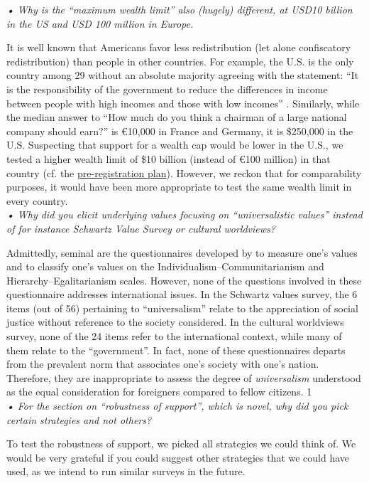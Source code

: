 \documentclass[12pt,english]{article}
\begin{document}
\textit{• Why is the “maximum wealth limit” also (hugely) different, at USD10 billion in the US and USD 100 million in Europe.} 

It is well known that Americans favor less redistribution (let alone confiscatory redistribution) than people in other countries. For example, the U.S. is the only country among 29 without an absolute majority agreeing with the statement: ``It is the responsibility of the government to reduce the differences in income between people with high incomes and those with low incomes'' \citep{issp_international_2019}. Similarly, while the median answer to ``How much do you think a chairman of a large national company should earn?'' is \euro{}10,000 in France and Germany, it is \$250,000 in the U.S. Suspecting that support for a wealth cap would be lower in the U.S., we tested a higher wealth limit of \$10 billion (instead of \euro{}100 million) in that country (cf. the \href{https://osf.io/2b6vq}{pre-registration plan}). However, we reckon that for comparability purposes, it would have been more appropriate to test the same wealth limit in every country.
~\\

\textit{• Why did you elicit underlying values focusing on “universalistic values” instead of for instance Schwartz Value Survey or cultural worldviews?}%

Admittedly, seminal are the questionnaires developed by \citet{schwartz_are_1994} to measure one's values and \citet{douglas_risk_1982} to classify one's values on the Individualism--Communitarianism and Hierarchy--Egalitarianism scales. However, none of the questions involved in these questionnaire addresses international issues. In the Schwartz values survey, the 6 items (out of 56) pertaining to ``universalism'' relate to the appreciation of social justice without reference to the society considered. In the cultural worldviews survey, none of the 24 items refer to the international context, while many of them relate to the ``government''. In fact, none of these questionnaires departs from the prevalent norm that associates one's society with one's nation. Therefore, they are inappropriate to assess the degree of \textit{universalism} understood as the equal consideration for foreigners compared to fellow citizens. 1
~\\

\textit{• For the section on “robustness of support”, which is novel, why did you pick certain strategies and not others?}

To test the robustness of support, we picked all strategies we could think of. We would be very grateful if you could suggest other strategies that we could have used, as we intend to run similar surveys in the future.
~\\
\end{document}
